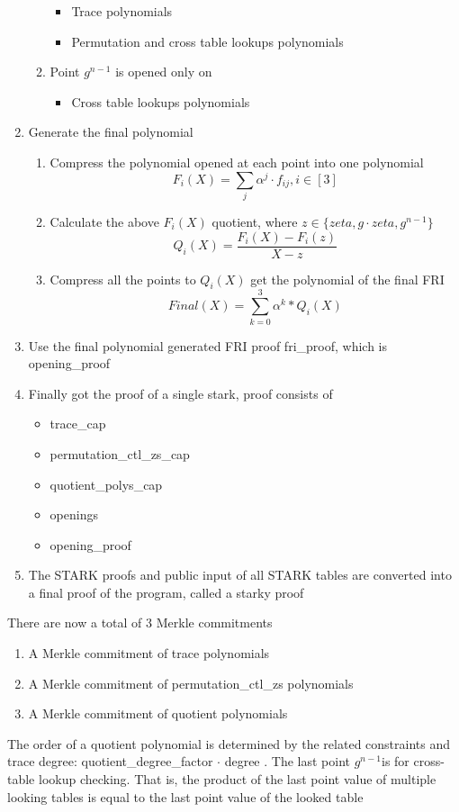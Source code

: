 \begin{enumerate}
\begin{enumerate}
            \begin{itemize}
                \item Trace polynomials
                \item Permutation and cross table lookups polynomials
            \end{itemize}
        \item Point $ g^{n-1} $ is opened only on
            \begin{itemize}
                \item Cross table lookups polynomials
            \end{itemize}
        \end{enumerate}
    \item Generate the final polynomial
        \begin{enumerate}
            \item Compress the polynomial opened at each point into one polynomial $$ F_i(X) = \sum_{j} \alpha^j \cdot f_{ij}, i \in [3] $$
            \item Calculate the above $ F_i(X) $ quotient, where $ z \in \{ zeta, g \cdot zeta, g^{n-1} \} $ $$ Q_i(X) = \frac{F_i(X) - F_i(z)}{X - z} $$
            \item Compress all the points to $ Q_i(X) $ get the polynomial of the final FRI $$ Final(X) = \sum_{k=0}^3 \alpha^k * Q_i(X) $$
        \end{enumerate}
    \item Use the final polynomial generated FRI proof fri\_proof, which is opening\_proof
    \item Finally got the proof of a single stark, proof consists of
        \begin{itemize}
            \item trace\_cap
            \item permutation\_ctl\_zs\_cap
            \item quotient\_polys\_cap
            \item openings
            \item opening\_proof
        \end{itemize}
    \item The STARK proofs and public input of all STARK tables are converted into a final proof of the program, called a starky proof
\end{enumerate}

\noindent There are now a total of 3 Merkle commitments

\begin{enumerate}
    \item A Merkle commitment of trace polynomials
    \item A Merkle commitment of permutation\_ctl\_zs polynomials
    \item A Merkle commitment of quotient polynomials
\end{enumerate}

The order of a quotient polynomial is determined by the related constraints and trace degree: quotient\_degree\_factor $ \cdot $ degree . The last point $ g^{n-1} $is for cross-table lookup checking. That is, the product of the last point value of multiple looking tables is equal to the last point value of the looked table